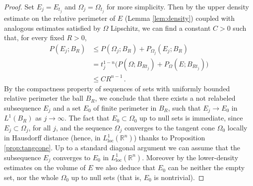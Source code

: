 \documentclass[a4paper,reqno,11pt]{amsart}
\newcommand{\R}{\mathbb{R}}
\newcommand{\loc}{\mathop{\mathrm{loc}}}
\newcommand{\pr}{P_{\Omega}}
\newcommand{\p}{P}
\begin{document}
\begin{proof}
Set $E_{j}=E_{t_{j}}$ and $\Omega_{j} = \Omega_{t_{j}}$ for more simplicity. Then by the upper density estimate on the relative perimeter of $E$ (Lemma \ref{lem:density}) coupled with analogous estimates satisfied by $\Omega$ Lipschitz, we can find a constant $C>0$ such that, for every fixed $R>0$, 
\begin{align*}
\p(E_{j}; B_{R}) &\le \p(\Omega_{j}; B_{R}) + \p_{\Omega_{j}}(E_{j};B_{R})\\
&= t_{j}^{1-n}\big(\p(\Omega;B_{Rt_{j}}) + \pr(E;B_{Rt_{j}})\big)\\
&\le CR^{n-1}\,.
\end{align*}
By the compactness property of sequences of sets with uniformly bounded relative perimeter the ball $B_{R}$, we conclude that there exists a not relabeled subsequence $E_{j}$ and a set $E_{0}$ of finite perimeter in $B_{R}$, such that $E_{j}\to E_{0}$ in $L^{1}(B_{R})$ as $j\to \infty$. The fact that $E_{0} \subset \Omega_{0}$ up to null sets is immediate, since $E_{j} \subset \Omega_{j}$, for all $j$, and the sequence $\Omega_{j}$ converges to the tangent cone $\Omega_{0}$ locally in Hausdorff distance (hence, in $L^{1}_{\loc}(\R^{n})$) thanks to Proposition \ref{prop:tangcone}. Up to a standard diagonal argument we can assume that the subsequence $E_{j}$ converges to $E_{0}$ in $L^{1}_{\loc}(\R^{n})$. Moreover by the lower-density estimates on the volume of $E$ we also deduce that $E_{0}$ can be neither the empty set, nor the whole $\Omega_{0}$ up to null sets (that is, $E_{0}$ is nontrivial).


\end{proof}
\end{document}
